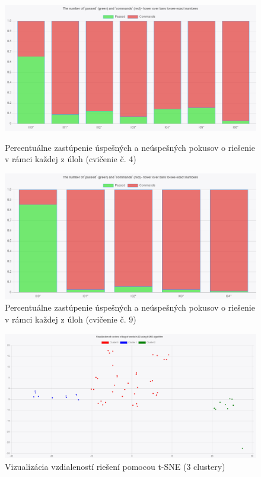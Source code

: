 \begin{figure}[h]
	\centerline{\includegraphics[width=1\textwidth]{images/histogram.png}}
	\caption[Percentuálne zastúpenie úspešných a neúspešných pokusov o riešenie]{Percentuálne zastúpenie úspešných a neúspešných pokusov o riešenie v rámci každej z úloh (cvičenie č. 4)}
	\label{img:histogram}
	
	\vspace{\baselineskip}
	\vspace{\baselineskip}
	
	\centerline{\includegraphics[width=1\textwidth]{images/histogram2.png}}
	\caption[Percentuálne zastúpenie úspešných a neúspešných pokusov o riešenie 2]{Percentuálne zastúpenie úspešných a neúspešných pokusov o riešenie v rámci každej z úloh (cvičenie č. 9)}
	\label{img:histogram2}
\end{figure}

\begin{figure}
	\centerline{\includegraphics[width=1\textwidth]{images/tsnevizualizacia.png}}
	\caption[Vizualizácia vzdialeností riešení pomocou t-SNE]{Vizualizácia vzdialeností riešení pomocou t-SNE (3 clustery)}
	\label{img:tsne}
\end{figure}


